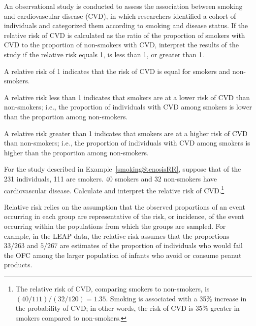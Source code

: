 \begin{example}{An observational study is conducted to assess the association between smoking and cardiovascular disease (CVD), in which researchers identified a cohort of individuals and categorized them according to smoking and disease status. If the relative risk of CVD is calculated as the ratio of the proportion of smokers with CVD to the proportion of non-smokers with CVD, interpret the results of the study if the relative risk equals 1, is less than 1, or greater than 1.}
	
A relative risk of 1 indicates that the risk of CVD is equal for smokers and non-smokers.

A relative risk less than 1 indicates that smokers are at a lower risk of CVD than non-smokers; i.e., the proportion of individuals with CVD among smokers is lower than the proportion among non-smokers.
	
A relative risk greater than 1 indicates that smokers are at a higher risk of CVD than non-smokers; i.e., the proportion of individuals with CVD among smokers is higher than the proportion among non-smokers.
	
\label{smokingStenosisRR}	
\end{example}

\begin{exercise}{For the study described in Example~\ref{smokingStenosisRR}, suppose that of the 231 individuals, 111 are smokers. 40 smokers and 32 non-smokers have cardiovascular disease. Calculate and interpret the relative risk of CVD.\footnote{The relative risk of CVD, comparing smokers to non-smokers, is $(40/111)/(32/120) = 1.35$. Smoking is associated with a 35\% increase in the probability of CVD; in other words, the risk of CVD is 35\% greater in smokers compared to non-smokers.}}
\end{exercise}

Relative risk relies on the assumption that the observed proportions of an event occurring in each group are representative of the risk, or incidence, of the event occurring within the populations from which the groups are sampled. For example, in the LEAP data, the relative risk assumes that the proportions $33/263$ and $5/267$ are estimates of the proportion of individuals who would fail the OFC among the larger population of infants who avoid or consume peanut products. 


